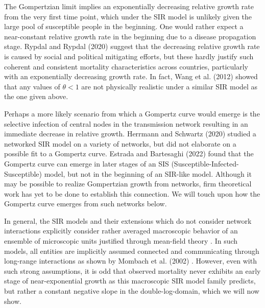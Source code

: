 \documentclass{article}
\begin{document}
 The Gompertzian limit implies an exponentially decreasing relative growth rate from the very first time point, which under the SIR model is unlikely given the large pool of susceptible people in the beginning. 
 One would rather expect a near-constant relative growth rate in the beginning due to a disease propagation stage. 
 Rypdal and Rypdal (2020) \cite{Rypdal2020} suggest that the decreasing relative growth rate is caused by social and political mitigating efforts, but these hardly justify such coherent and consistent mortality characteristics across countries, particularly with an exponentially decreasing growth rate. In fact, Wang et al. (2012) \cite{wang2012richards} showed that any values of $\theta<1$ are not physically realistic under a similar SIR model as the one given above. 
 
 Perhaps a more likely scenario from which a Gompertz curve would emerge is the selective infection of central nodes in the transmission network resulting in an immediate decrease in relative growth. 
 Herrmann and Schwartz (2020) \cite{herrmann2020covid} studied a networked SIR model on a variety of networks, but did not elaborate on a possible fit to a Gompertz curve. Estrada and Bartesaghi (2022) \cite{estrada2022networked} found that the Gompertz curve can emerge in later stages of an SIS (Susceptible-Infected-Susceptible) model, but not in the beginning of an SIR-like model.
 Although it may be possible to realize Gompertzian growth from networks, firm theoretical work has yet to be done to establish this connection. 
 We will touch upon how the Gompertz curve emerges from such networks below.

 In general, the SIR models and their extensions which do not consider network interactions explicitly consider rather averaged macroscopic behavior of an ensemble of microscopic units justified through mean-field theory \cite{smilkov2014beyond}. In such models, all entities are implicitly assumed connected and communicating through long-range interactions as shown by Mombach et al. (2002) \cite{mombach2002mean}.
However, even with such strong assumptions, it is odd that observed mortality never exhibits an early stage of near-exponential growth as this macroscopic SIR model family predicts, but rather a constant negative slope in the double-log-domain, which we will now show. 
\end{document}
